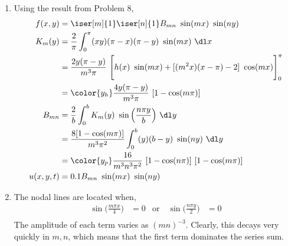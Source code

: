\begin{enumerate}
    \item Using the result from Problem $ 8 $,
          \begin{align}
              f(x, y)    & = \iser[m]{1} \iser[n]{1} B_{mn}\ \sin(mx)\ \sin(ny)  \\
              K_m(y)     & = \frac{2}{\pi} \int_{0}^{\pi} (xy)(\pi - x)(\pi - y)
              \ \sin(mx)\ \dl x                                                  \\
                         & = \frac{2y(\pi-y)}{m^3 \pi}\ \Bigg[ h(x)
              \ \sin(mx) + [(m^2x)(x-\pi) - 2]\ \cos(mx)\Bigg]_0^\pi             \\
                         & = \color{y_h} \frac{4y(\pi-y)}{m^3\pi}
              \ [1 - \cos(m\pi)]                                                 \\
              B_{mn}     & = \frac{2}{b} \int_{0}^{b} K_m(y)
              \ \sin\Big(\frac{n\pi y }{b} \Big)\ \dl y                          \\
                         & = \frac{8[1 - \cos(m\pi)]}{m^3\pi^2}
              \int_{0}^{b} (y)(b-y)\ \sin(ny)\ \dl y                             \\
                         & = \color{y_p} \frac{16}{m^3n^3\pi^2}
              \ [1 - \cos(n\pi)]\ [1 - \cos(m\pi)]                               \\
              u(x, y, t) & = 0.1B_{mn}\ \sin(mx)\ \sin(ny)
          \end{align}

    \item The nodal lines are located when,
          \begin{align}
              \sin\Big( \frac{m\pi x}{4} \Big)                & = 0 &
              \text{or}\quad \sin\Big( \frac{n\pi y}{2} \Big) & = 0   \\
          \end{align}
          The amplitude of each term varies as $ (mn)^{-3} $. Clearly, this decays very
          quickly in $ m,n $, which means that the first term dominates the series sum.


\end{enumerate}
